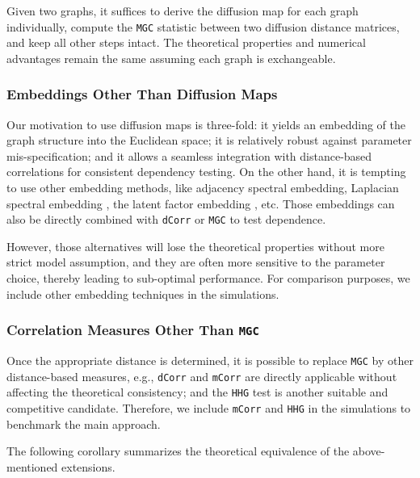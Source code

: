 \documentclass[11pt]{article}
\theoremstyle{definition}
\begin{document}
Given two graphs, it suffices to derive the diffusion map for each graph individually, compute the \texttt{MGC} statistic between two diffusion distance matrices, and keep all other steps intact. The theoretical properties and numerical advantages remain the same assuming each graph is exchangeable.

\subsubsection*{Embeddings Other Than Diffusion Maps}
Our motivation to use diffusion maps is three-fold: it yields an embedding of the graph structure into the Euclidean space; it is relatively robust against parameter mis-specification; and it allows a seamless integration with distance-based correlations for consistent dependency testing. On the other hand, it is tempting to use other embedding methods, like adjacency spectral embedding, Laplacian spectral embedding \cite{rohe2011spectral}, the latent factor embedding \cite{fosdick2015testing}, etc. Those embeddings can also be directly combined with \texttt{dCorr} or \texttt{MGC} to test dependence.

However, those alternatives will lose the theoretical properties without more strict model assumption, and they are often more sensitive to the parameter choice, thereby leading to sub-optimal performance. For comparison purposes, we include other embedding techniques in the simulations.

\subsubsection*{Correlation Measures Other Than \texttt{MGC}} 
Once the appropriate distance is determined, it is possible to replace \texttt{MGC} by other distance-based measures, e.g., \texttt{dCorr} and \texttt{mCorr} are directly applicable without affecting the theoretical consistency; and the \texttt{HHG} test is another suitable and competitive candidate. Therefore, we include \texttt{mCorr} and \texttt{HHG} in the simulations to benchmark the main approach.

The following corollary summarizes the theoretical equivalence of the above-mentioned extensions.
\end{document}
